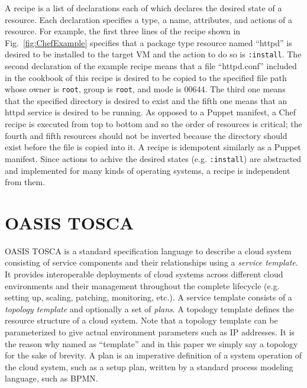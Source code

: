 \documentclass[12pt]{report}
\begin{document}
A recipe is a list of declarations each of which declares the desired
state of a resource. Each declaration specifies a type, a name,
attributes, and actions of a resource. For example, the first three
lines of the recipe shown in Fig.~\ref{fig:ChefExample} specifies that
a package type resource named ``httpd'' is desired to be installed to
the target VM and the action to do so is {\tt :install}. The second
declaration of the example recipe means that a file ``httpd.conf''
included in the cookbook of this recipe is desired to be copied to the
specified file path whose owner is {\tt root}, group is {\tt root},
and mode is 00644. The third one means that the specified directory is
desired to exist and the fifth one means that an httpd service is
desired to be running. As opposed to a Puppet manifest, a Chef recipe
is executed from top to bottom and so the order of resources is
critical; the fourth and fifth resources should not be inverted
because the directory should exist before the file is copied into
it. A recipe is idempotent similarly as a Puppet manifest. Since
actions to achive the desired states (e.g. {\tt :install}) are
abstracted and implemented for many kinds of operating systems, a
recipe is independent from them.

\section{OASIS TOSCA}
\label{sec:TOSCA}
OASIS TOSCA\cite{TOSCA} is a standard specification language to
describe a cloud system consisting of service components and their
relationships using a {\it service template}. It provides
interoperable deployments of cloud systems across different cloud
environments and their management throughout the complete lifecycle
(e.g. setting up, scaling, patching, monitoring, etc.).  A service
template consists of a {\it topology template} and optionally a set of
{\it plans}. A topology template defines the resource structure of a
cloud system. Note that a topology template can be parameterized
to give actual environment parameters such as IP addresses. It is the
reason why named as ``template'' and in this paper we simply say a
topology for the sake of brevity. A plan is an imperative definition
of a system operation of the cloud system, such as a setup plan,
written by a standard process modeling language, such as BPMN.
\end{document}
